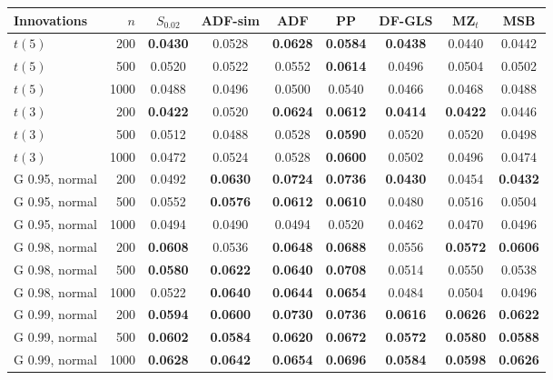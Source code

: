 \begin{tabular}{lrccccccc}
\toprule
Innovations & $n$ & $S_{0.02}$ & ADF-sim & ADF & PP & DF-GLS & MZ$_t$ & MSB \\
\midrule
$t(5)$ & 200 & \textbf{0.0430} & 0.0528 & \textbf{0.0628} & \textbf{0.0584} & \textbf{0.0438} & 0.0440 & 0.0442 \\
$t(5)$ & 500 & 0.0520 & 0.0522 & 0.0552 & \textbf{0.0614} & 0.0496 & 0.0504 & 0.0502 \\
$t(5)$ & 1000 & 0.0488 & 0.0496 & 0.0500 & 0.0540 & 0.0466 & 0.0468 & 0.0488 \\
$t(3)$ & 200 & \textbf{0.0422} & 0.0520 & \textbf{0.0624} & \textbf{0.0612} & \textbf{0.0414} & \textbf{0.0422} & 0.0446 \\
$t(3)$ & 500 & 0.0512 & 0.0488 & 0.0528 & \textbf{0.0590} & 0.0520 & 0.0520 & 0.0498 \\
$t(3)$ & 1000 & 0.0472 & 0.0524 & 0.0528 & \textbf{0.0600} & 0.0502 & 0.0496 & 0.0474 \\
G 0.95, normal & 200 & 0.0492 & \textbf{0.0630} & \textbf{0.0724} & \textbf{0.0736} & \textbf{0.0430} & 0.0454 & \textbf{0.0432} \\
G 0.95, normal & 500 & 0.0552 & \textbf{0.0576} & \textbf{0.0612} & \textbf{0.0610} & 0.0480 & 0.0516 & 0.0504 \\
G 0.95, normal & 1000 & 0.0494 & 0.0490 & 0.0494 & 0.0520 & 0.0462 & 0.0470 & 0.0496 \\
G 0.98, normal & 200 & \textbf{0.0608} & 0.0536 & \textbf{0.0648} & \textbf{0.0688} & 0.0556 & \textbf{0.0572} & \textbf{0.0606} \\
G 0.98, normal & 500 & \textbf{0.0580} & \textbf{0.0622} & \textbf{0.0640} & \textbf{0.0708} & 0.0514 & 0.0550 & 0.0538 \\
G 0.98, normal & 1000 & 0.0522 & \textbf{0.0640} & \textbf{0.0644} & \textbf{0.0654} & 0.0484 & 0.0504 & 0.0496 \\
G 0.99, normal & 200 & \textbf{0.0594} & \textbf{0.0600} & \textbf{0.0730} & \textbf{0.0736} & \textbf{0.0616} & \textbf{0.0626} & \textbf{0.0622} \\
G 0.99, normal & 500 & \textbf{0.0602} & \textbf{0.0584} & \textbf{0.0620} & \textbf{0.0672} & \textbf{0.0572} & \textbf{0.0580} & \textbf{0.0588} \\
G 0.99, normal & 1000 & \textbf{0.0628} & \textbf{0.0642} & \textbf{0.0654} & \textbf{0.0696} & \textbf{0.0584} & \textbf{0.0598} & \textbf{0.0626} \\

\end{tabular}
